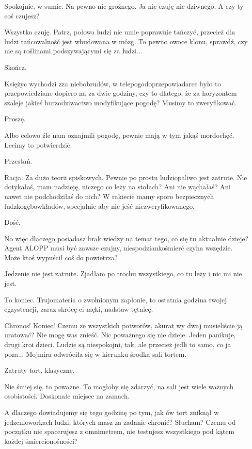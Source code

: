 \ds{} Spokojnie, w sumie. Na pewno nic groźnego. Ja nie czuję nic dziwnego. A czy ty coś czujesz? \de{}

\ds{} Wszystko czuję. Patrz, połowa ludzi nie umie poprawnie tańczyć, przecież dla ludzi tańcowalność jest wbudowana w mózg.
To pewno owoce klonu, sprawdź, czy nie są roślinami podszywającymi się za ludzi... \de{}

\ds{} Skończ. \de{}

\ds{} Księżyc wychodzi zza niebobrudów, w telepogodoprzepowiadarce było to przepowiedziane dopiero na za dwie godziny, czy to dlatego, że za horyzontem szaleje jakieś burzodziwactwo modyfikujące pogodę? Musimy to zweryfikować. \de{}

\ds{} Proszę. \de{}

\ds{} Albo celowo źle nam oznajmili pogodę, pewnie mają w tym jakąś mordochęć. Lecimy to potwierdzić. \de{}

\ds{} Przestań. \de{}

\ds{} Racja. Za dużo teorii spiskowych. Pewnie po prostu ludziopaliwo jest zatrute. Nie dotykałaś, mam nadzieję, niczego co leży na stołach? Ani nie wąchałaś? Ani nawet nie podchodziłaś do nich?
W rakiecie mamy sporo bezpiecznych ludzkogębowkładów, specjalnie aby nie jeść niezweryfikowanego. \de{}

\ds{} Dość. 

\ds{} No więc dlaczego posiadasz brak wiedzy na temat tego, co się tu aktualnie dzieje? 
Agent ALOPP musi być zawsze czujny, niespodziankośmierć czyha wszędzie. Może ktoś wypuścił coś do powietrza? \de{}

\ds{} Jedzenie nie jest zatrute. Zjadłam po trochu wszystkiego, co tu leży i nic mi nie jest. \de{}

\ds{} To koniec. Trujomateria o zwolnionym zapłonie, to ostatnia godzina twojej egzystencji, zaraz skrócę ci męki, nadstaw tętnicę. \de{}

\ds{} Chronos! Koniec! Czemu ze wszystkich potworów, akurat wy dwaj musieliście ją uratować? Nie mogę was znieść. Nic poważnego się nie dzieje. 
Jeden panikuje, drugi kroi dzieci.
Ludzie są niespokojni, tak, ale przecież jedli to samo, co ja poza...
\dm{} Mojmira odwróciła się w kierunku środka sali \dm{} tortem. \de{}

\ds{} Zatruty tort, klasyczne. \de{}

\ds{} Nie śmiej się, to poważne. To mogłoby się zdarzyć, na sali jest wiele ważnych osobistości. Doskonałe miejsce na zamach. \de{}

\ds{} A dlaczego dowiadujemy się tego godzinę po tym, jak ów tort zniknął w jedzenioworkach ludzi, których masz za zadanie chronić? Słucham? 
Czemu od początku nie spacerujesz z omnimetrem, nie testujesz wszystkiego pod kątem każdej śmiercionośności? \de{}

